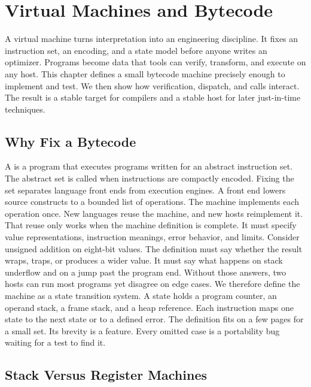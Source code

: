 \chapter{Virtual Machines and Bytecode}\label{ch:virtual-machines-bytecode}

A virtual machine turns interpretation into an engineering discipline.
It fixes an instruction set, an encoding, and a state model before anyone writes an optimizer.
Programs become data that tools can verify, transform, and execute on any host.
This chapter defines a small bytecode machine precisely enough to implement and test.
We then show how verification, dispatch, and calls interact.
The result is a stable target for compilers and a stable host for later just-in-time techniques.

\section{Why Fix a Bytecode}\label{sec:ch31-why-bytecode}

A  is a program that executes programs written for an abstract instruction set.
The abstract set is called  when instructions are compactly encoded.
Fixing the set separates language front ends from execution engines.
A front end lowers source constructs to a bounded list of operations.
The machine implements each operation once.
New languages reuse the machine, and new hosts reimplement it.
That reuse only works when the machine definition is complete.
It must specify value representations, instruction meanings, error behavior, and limits.
Consider unsigned addition on eight-bit values.
The definition must say whether the result wraps, traps, or produces a wider value.
It must say what happens on stack underflow and on a jump past the program end.
Without those answers, two hosts can run most programs yet disagree on edge cases.
We therefore define the machine as a state transition system.
A state holds a program counter, an operand stack, a frame stack, and a heap reference.
Each instruction maps one state to the next state or to a defined error.
The definition fits on a few pages for a small set.
Its brevity is a feature.
Every omitted case is a portability bug waiting for a test to find it.

\section{Stack Versus Register Machines}\label{sec:ch31-stack-register}

